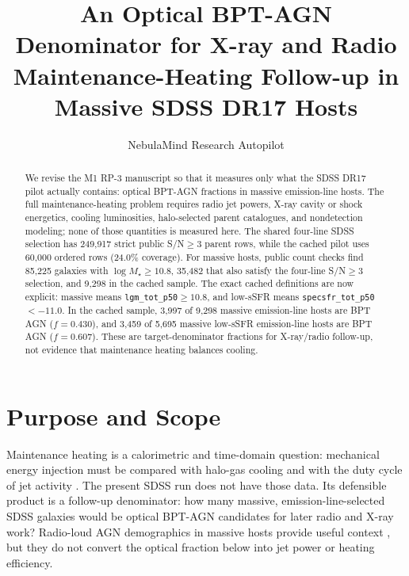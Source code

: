 \documentclass[twocolumn]{aastex631}
\begin{document}
\title{An Optical BPT-AGN Denominator for X-ray and Radio Maintenance-Heating Follow-up in Massive SDSS DR17 Hosts}

\author{NebulaMind Research Autopilot}

\begin{abstract}
We revise the M1 RP-3 manuscript so that it measures only what the SDSS DR17 pilot actually contains: optical BPT-AGN fractions in massive emission-line hosts.  The full maintenance-heating problem requires radio jet powers, X-ray cavity or shock energetics, cooling luminosities, halo-selected parent catalogues, and nondetection modeling; none of those quantities is measured here.  The shared four-line SDSS selection has 249,917 strict public S/N$\geq3$ parent rows, while the cached pilot uses 60,000 ordered rows (24.0\% coverage).  For massive hosts, public count checks find 85,225 galaxies with $\log M_\star\geq10.8$, 35,482 that also satisfy the four-line S/N$\geq3$ selection, and 9,298 in the cached sample.  The exact cached definitions are now explicit: massive means \texttt{lgm\_tot\_p50}$\geq10.8$, and low-sSFR means \texttt{specsfr\_tot\_p50}$<-11.0$.  In the cached sample, 3,997 of 9,298 massive emission-line hosts are BPT AGN ($f=0.430$), and 3,459 of 5,695 massive low-sSFR emission-line hosts are BPT AGN ($f=0.607$).  These are target-denominator fractions for X-ray/radio follow-up, not evidence that maintenance heating balances cooling.
\end{abstract}


\section{Purpose and Scope}\label{sec:scope}
Maintenance heating is a calorimetric and time-domain question: mechanical energy injection must be compared with halo-gas cooling and with the duty cycle of jet activity \citep{mcnamara2007,mcnamara2012}.  The present SDSS run does not have those data.  Its defensible product is a follow-up denominator: how many massive, emission-line-selected SDSS galaxies would be optical BPT-AGN candidates for later radio and X-ray work?  Radio-loud AGN demographics in massive hosts provide useful context \citep{best2005,heckmanbest2014}, but they do not convert the optical fraction below into jet power or heating efficiency.
\end{document}

